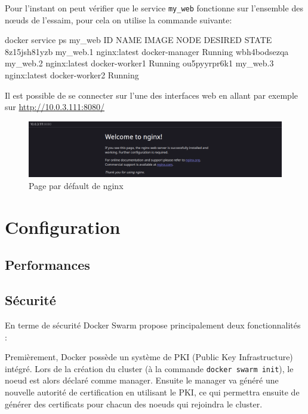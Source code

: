 Pour l'instant on peut vérifier que le service \verb:my_web: fonctionne sur l'ensemble des
nœuds de l'essaim, pour cela on utilise la commande suivante:
\begin{bash}
docker service ps my_web
ID           NAME     IMAGE        NODE           DESIRED STATE
8z15jsh81yzb my_web.1 nginx:latest docker-manager Running      
wbh4bodsezqa my_web.2 nginx:latest docker-worker1 Running      
ou5pyyrpr6k1 my_web.3 nginx:latest docker-worker2 Running       
\end{bash}
\newpage

Il est possible de se connecter sur l'une des interfaces web en allant par exemple sur 
\url{http://10.0.3.111:8080/}

\begin{figure}[h!]
    \centering
    \includegraphics[width=\textwidth]{img/nginx}
    \caption{Page par défault de nginx}
\end{figure}

\chapter{Configuration}

\section{Performances}



\section{Sécurité}

En terme de sécurité Docker Swarm propose principalement deux fonctionnalités :\newline

Premièrement, Docker possède un système de PKI (Public Key Infrastructure) intégré.
Lors de la création du cluster (à la commande \verb:docker swarm init:), le noeud est
alors déclaré comme manager. Ensuite le manager va généré une nouvelle autorité de 
certification en utilisant le PKI, ce qui permettra ensuite de générer des certificats pour
chacun des noeuds qui rejoindra le cluster.

